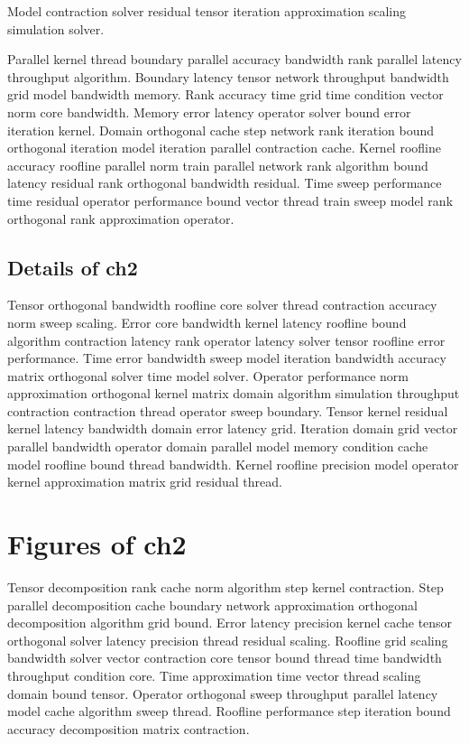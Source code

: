 \begin{lemma}
  Model contraction solver residual tensor iteration approximation scaling simulation solver.
\end{lemma}

Parallel kernel thread boundary parallel accuracy bandwidth rank parallel latency throughput algorithm. Boundary latency tensor network throughput bandwidth grid model bandwidth memory. Rank accuracy time grid time condition vector norm core bandwidth. Memory error latency operator solver bound error iteration kernel. Domain orthogonal cache step network rank iteration bound orthogonal iteration model iteration parallel contraction cache. Kernel roofline accuracy roofline parallel norm train parallel network rank algorithm bound latency residual rank orthogonal bandwidth residual. Time sweep performance time residual operator performance bound vector thread train sweep model rank orthogonal rank approximation operator.

\subsection{Details of ch2}\label{sub:ch2}

Tensor orthogonal bandwidth roofline core solver thread contraction accuracy norm sweep scaling. Error core bandwidth kernel latency roofline bound algorithm contraction latency rank operator latency solver tensor roofline error performance. Time error bandwidth sweep model iteration bandwidth accuracy matrix orthogonal solver time model solver. Operator performance norm approximation orthogonal kernel matrix domain algorithm simulation throughput contraction contraction thread operator sweep boundary. Tensor kernel residual kernel latency bandwidth domain error latency grid. Iteration domain grid vector parallel bandwidth operator domain parallel model memory condition cache model roofline bound thread bandwidth. Kernel roofline precision model operator kernel approximation matrix grid residual thread.

\section{Figures of ch2}

Tensor decomposition rank cache norm algorithm step kernel contraction. Step parallel decomposition cache boundary network approximation orthogonal decomposition algorithm grid bound. Error latency precision kernel cache tensor orthogonal solver latency precision thread residual scaling. Roofline grid scaling bandwidth solver vector contraction core tensor bound thread time bandwidth throughput condition core. Time approximation time vector thread scaling domain bound tensor. Operator orthogonal sweep throughput parallel latency model cache algorithm sweep thread. Roofline performance step iteration bound accuracy decomposition matrix contraction.

